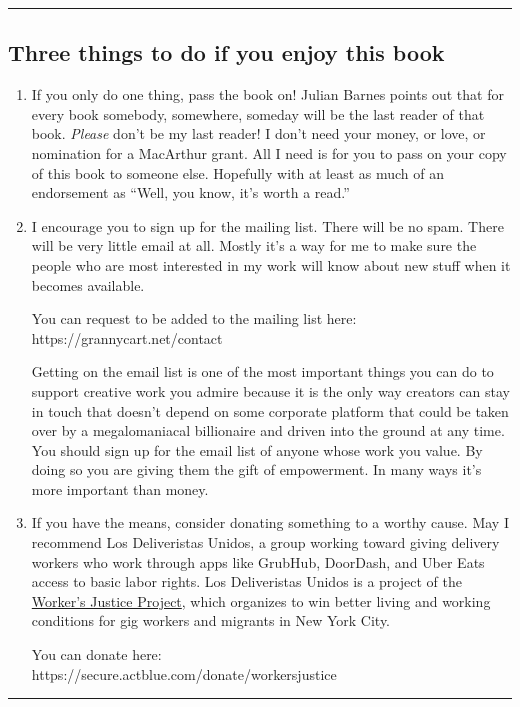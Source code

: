 \documentclass[
]{scrbook}
\begin{document}
\newpage


\normalsize

\begin{center}\rule{0.5\linewidth}{0.5pt}\end{center}

\hypertarget{three-things-to-do-if-you-enjoy-this-book}{%
\subsection{Three things to do if you enjoy this
book}\label{three-things-to-do-if-you-enjoy-this-book}}

\begin{enumerate}
\def\labelenumi{\arabic{enumi}.}
\item
  If you only do one thing, pass the book on! Julian Barnes points out
  that for every book somebody, somewhere, someday will be the last
  reader of that book. \emph{Please} don't be my last reader! I don't
  need your money, or love, or nomination for a MacArthur grant. All I
  need is for you to pass on your copy of this book to someone else.
  Hopefully with at least as much of an endorsement as ``Well, you know,
  it's worth a read.''
\item
  I encourage you to sign up for the mailing list. There will be no
  spam. There will be very little email at all. Mostly it's a way for me
  to make sure the people who are most interested in my work will know
  about new stuff when it becomes available.

  You can request to be added to the mailing list here:\\
  https://grannycart.net/contact

  Getting on the email list is one of the most important things you can
  do to support creative work you admire because it is the only way
  creators can stay in touch that doesn't depend on some corporate
  platform that could be taken over by a megalomaniacal billionaire and
  driven into the ground at any time. You should sign up for the email
  list of anyone whose work you value. By doing so you are giving them
  the gift of empowerment. In many ways it's more important than money.
\item
  If you have the means, consider donating something to a worthy cause.
  May I recommend Los Deliveristas Unidos, a group working toward giving
  delivery workers who work through apps like GrubHub, DoorDash, and
  Uber Eats access to basic labor rights. Los Deliveristas Unidos is a
  project of the
  \href{http://www.workersjustice.org/workers-justice-project}{Worker's
  Justice Project}, which organizes to win better living and working
  conditions for gig workers and migrants in New York City.

  You can donate here:\\
  https://secure.actblue.com/donate/workersjustice
\end{enumerate}

\begin{center}\rule{0.5\linewidth}{0.5pt}\end{center}

\backmatter
\end{document}
